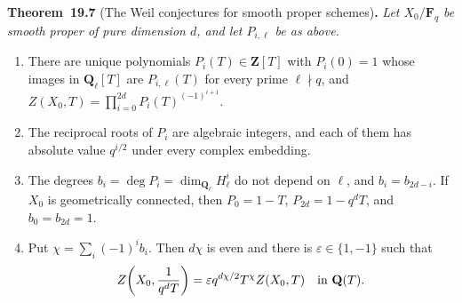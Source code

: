 \documentclass[11pt]{article}
\newenvironment{bpstatement}[2]{\par\addvspace{0.6\baselineskip}\noindent\textbf{#1}#2\textbf{.}\enspace\ignorespaces}
  {\par\addvspace{0.4\baselineskip}}
\newenvironment{bpstatementit}[2]{\begin{bpstatement}{#1}{#2}\itshape\ignorespaces}{\end{bpstatement}}
\begin{document}
\label{bp342}%
\begin{bpstatementit}{Theorem~19.7}{ (The Weil conjectures for smooth proper schemes)}
Let \(X_0/\mathbf F_q\) be smooth proper of pure dimension \(d\), and let \(P_{i,\ell}\) be as above.

\begin{enumerate}
\item There are unique polynomials \(P_i(T)\in\mathbf Z[T]\) with \(P_i(0)=1\) whose images in \(\mathbf Q_\ell[T]\) are \(P_{i,\ell}(T)\) for every prime \(\ell\nmid q\), and \(Z(X_0,T)=\prod_{i=0}^{2d}P_i(T)^{(-1)^{i+1}}\).
\item The reciprocal roots of \(P_i\) are algebraic integers, and each of them has absolute value \(q^{i/2}\) under every complex embedding.
\item The degrees \(b_i=\deg P_i=\dim_{\mathbf Q_\ell}H^i_\ell\) do not depend on \(\ell\), and \(b_i=b_{2d-i}\). If \(X_0\) is geometrically connected, then \(P_0=1-T\), \(P_{2d}=1-q^dT\), and \(b_0=b_{2d}=1\).
\item Put \(\chi=\sum_i(-1)^ib_i\). Then \(d\chi\) is even and there is \(\varepsilon\in\{1,-1\}\) such that \[
   Z\!\left(X_0,\frac1{q^dT}\right)
   =\varepsilon q^{d\chi/2}T^\chi Z(X_0,T)
   \quad\hbox{in }\mathbf Q(T).
   \]
\end{enumerate}
\end{bpstatementit}
\end{document}
